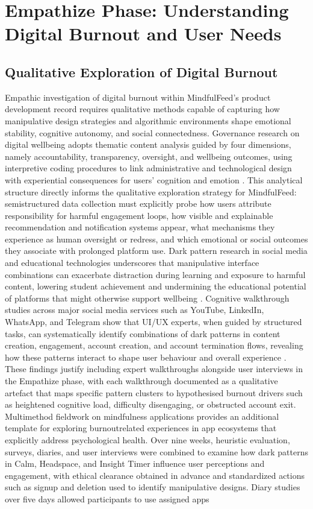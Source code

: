 \documentclass{article}
\begin{document}
\section{Empathize Phase: Understanding Digital Burnout and User Needs}

\subsection{Qualitative Exploration of Digital Burnout}
\label{sec:qual_explore_burnout} Empathic investigation of digital burnout within MindfulFeed's product development record requires qualitative methods capable of capturing how manipulative design strategies and algorithmic environments shape emotional stability, cognitive autonomy, and social connectedness. Governance research on digital well\-being adopts thematic content analysis guided by four dimensions, namely accountability, transparency, oversight, and well\-being outcomes, using interpretive coding procedures to link administrative and technological design with experiential consequences for users' cognition and emotion \parencites[7]{7808872}[8]{7808872}. This analytical structure directly informs the qualitative exploration strategy for MindfulFeed: semi\-structured data collection must explicitly probe how users attribute responsibility for harmful engagement loops, how visible and explainable recommendation and notification systems appear, what mechanisms they experience as human oversight or redress, and which emotional or social outcomes they associate with prolonged platform use. Dark pattern research in social media and educational technologies underscores that manipulative interface combinations can exacerbate distraction during learning and exposure to harmful content, lowering student achievement and undermining the educational potential of platforms that might otherwise support wellbeing \parencites[3]{4692551}. Cognitive walkthrough studies across major social media services such as YouTube, LinkedIn, WhatsApp, and Telegram show that UI/UX experts, when guided by structured tasks, can systematically identify combinations of dark patterns in content creation, engagement, account creation, and account termination flows, revealing how these patterns interact to shape user behaviour and overall experience \parencites[2]{4692551}[3]{4692551}. These findings justify including expert walkthroughs alongside user interviews in the Empathize phase, with each walkthrough documented as a qualitative artefact that maps specific pattern clusters to hypothesised burnout drivers such as heightened cognitive load, difficulty disengaging, or obstructed account exit. Multi\-method fieldwork on mindfulness applications provides an additional template for exploring burnout\-related experiences in app ecosystems that explicitly address psychological health. Over nine weeks, heuristic evaluation, surveys, diaries, and user interviews were combined to examine how dark patterns in Calm, Headspace, and Insight Timer influence user perceptions and engagement, with ethical clearance obtained in advance and standardized actions such as sign\-up and deletion used to identify manipulative designs. Diary studies over five days allowed participants to use assigned apps 
\end{document}

